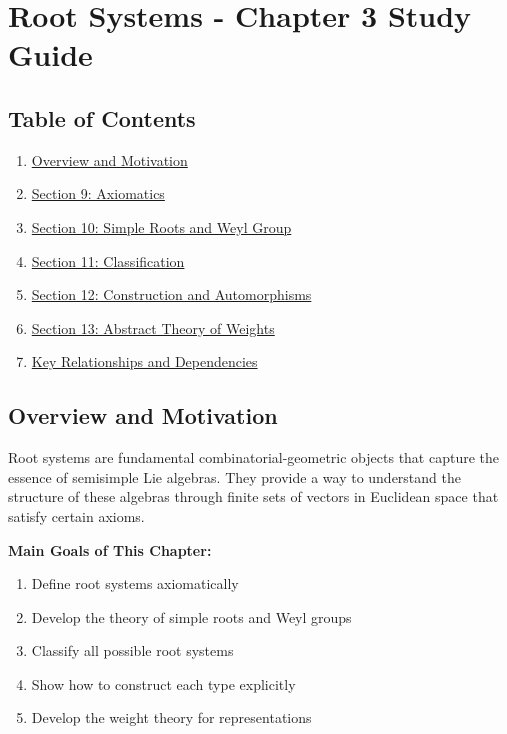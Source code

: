 \chapter{Root Systems - Chapter 3 Study Guide}

\section{Table of Contents}

\begin{enumerate}
	\item \href{#overview-and-motivation}{Overview and Motivation}
	\item \href{#section-9-axiomatics}{Section 9: Axiomatics}
	\item \href{#section-10-simple-roots-and-weyl-group}{Section 10: Simple Roots and Weyl Group}
	\item \href{#section-11-classification}{Section 11: Classification}
	\item \href{#section-12-construction-and-automorphisms}{Section 12: Construction and Automorphisms}
	\item \href{#section-13-abstract-theory-of-weights}{Section 13: Abstract Theory of Weights}
	\item \href{#key-relationships-and-dependencies}{Key Relationships and Dependencies}
\end{enumerate}

\section{Overview and Motivation}

Root systems are fundamental combinatorial-geometric objects that capture the essence of semisimple Lie algebras. They provide a way to understand the structure of these algebras through finite sets of vectors in Euclidean space that satisfy certain axioms.

\textbf{Main Goals of This Chapter:}

\begin{enumerate}
	\item Define root systems axiomatically
	\item Develop the theory of simple roots and Weyl groups
	\item Classify all possible root systems
	\item Show how to construct each type explicitly
	\item Develop the weight theory for representations
\end{enumerate}


